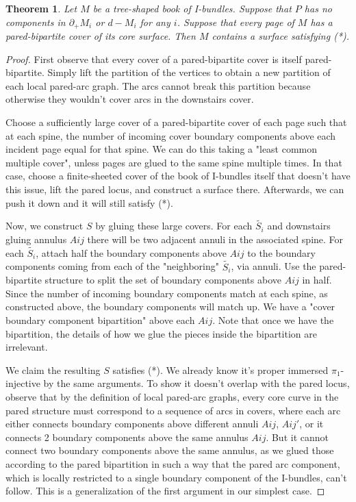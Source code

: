 \documentclass[12pt]{amsart}
\newtheorem{thm}[theorem]{Theorem}
\theoremstyle{definition}
\newcommand{\bd}{\partial}
\begin{document}
\begin{thm}

Let $M$ be a tree-shaped book of I-bundles. Suppose that $P$ has no components
in $\bd_+M_i$ or $d-M_i$ for any $i$. Suppose that every page of $M$ has
a pared-bipartite cover of its core surface. Then $M$ contains a surface
satisfying (*).

\end{thm}
\begin{proof}

First observe that every cover of a pared-bipartite cover is itself
pared-bipartite. Simply lift the partition of the vertices to obtain a new
partition of each local pared-arc graph. The arcs cannot break this
partition because otherwise they wouldn't cover arcs in the downstairs cover.

Choose a sufficiently large cover of a pared-bipartite cover of each page such
that at each spine, the number of incoming cover boundary components above each
incident page equal for that spine. We can do this taking a "least common
multiple cover", unless pages are glued to the same spine multiple times. In
that case, choose a finite-sheeted cover of the book of I-bundles itself that
doesn't have this issue, lift the pared locus, and construct a surface there.
Afterwards, we can push it down and it will still satisfy (*).

Now, we construct $S$ by gluing these large covers. For each $\widetilde{S_i}$
and downstairs gluing annulus $Aij$ there will be two adjacent annuli in the
associated spine. For each $\widetilde{S_i}$, attach half the boundary
components above $Aij$ to the boundary components coming from each of the
"neighboring" $\widetilde{S_i}$, via annuli. Use the pared-bipartite structure
to split the set of boundary components above $Aij$ in half. Since the number
of incoming boundary components match at each spine, as constructed above, the
boundary components will match up. We have a "cover boundary component
bipartition" above each $Aij$. Note that once we have the bipartition, the
details of how we glue the pieces inside the bipartition are irrelevant.

We claim the resulting $S$ satisfies (*). We already know it's proper immersed
$\pi_1$-injective by the same arguments. To show it doesn't overlap with the
pared locus, observe that by the definition of local pared-arc graphs, every
core curve in the pared structure must correspond to a sequence of arcs in
covers, where each arc either connects boundary components above different
annuli $Aij$, $Aij'$, or it connects 2 boundary components above the same
annulus $Aij$. But it cannot connect two boundary components above the same
annulus, as we glued those according to the pared bipartition in such a way
that the pared arc component, which is locally restricted to a single boundary
component of the I-bundles, can't follow. This is a generalization of the first
argument in our simplest case.


\end{proof}
\end{document}
